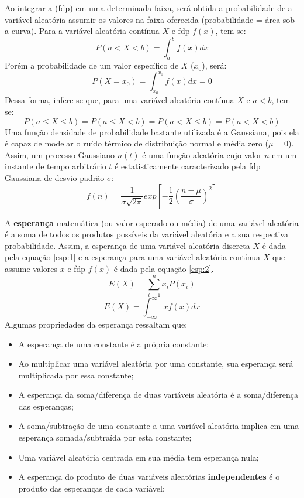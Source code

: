 Ao integrar a (fdp) em uma determinada faixa, será obtida a probabilidade de a variável aleatória assumir os valores na faixa oferecida (probabilidade = área sob a curva). Para a variável aleatória contínua $X$ e fdp $f(x)$, tem-se:
\begin{equation} \label{fdp:1}
    P(a<X<b) = \int_{a}^{b} f(x) dx
\end{equation}
Porém a probabilidade de um valor específico de $X$ ($x_0$), será:
\begin{equation} \label{fdp:2}
    P(X=x_0) = \int_{x_0}^{x_0} f(x) dx = 0
\end{equation}
Dessa forma, infere-se que, para uma variável aleatória contínua $X$ e $a<b$, tem-se:
\begin{equation} \label{fdp:2}
    P(a \leq X \leq b) = P(a \leq X < b) = P(a < X \leq b) = P(a < X < b)
\end{equation}
Uma função densidade de probabilidade bastante utilizada é a Gaussiana, pois ela é capaz de modelar o ruído térmico de distribuição normal e média zero ($\mu = 0$). Assim, um processo Gaussiano $n(t)$ é uma função aleatória cujo valor $n$ em um instante de tempo arbitrário $t$ é estatisticamente caracterizado pela fdp Gaussiana de desvio padrão $\sigma$: \cite{ref8}
\begin{equation} \label{fdp:2}
    f(n) = \frac{1}{\sigma\sqrt{2\pi}}exp\left[-\frac{1}{2}\left(\frac{n-\mu}{\sigma}\right)^2\right]
\end{equation}

A \textbf{esperança} matemática (ou valor esperado ou média) de uma variável aleatória é a soma de todos os produtos possíveis da variável aleatória e a sua respectiva probabilidade. Assim, a esperança de uma variável aleatória discreta $X$ é dada pela equação \ref{esp:1} e a esperança para uma variável aleatória contínua $X$ que assume valores $x$ e fdp $f(x)$ é dada pela equação \ref{esp:2}.
\begin{equation} \label{esp:1}
    E(X) = \sum_{i=1}^{n} x_iP(x_i)
\end{equation}
\begin{equation} \label{esp:2}
    E(X) = \int_{-\infty}^{\infty} x f(x) dx
\end{equation}
Algumas propriedades da esperança ressaltam que:
\begin{itemize}
    \item A esperança de uma constante é a própria constante;
    \item Ao multiplicar uma variável aleatória por uma constante, sua esperança será multiplicada por essa constante;
    \item A esperança da soma/diferença de duas variáveis aleatória é a soma/diferença das esperanças;
    \item A soma/subtração de uma constante a uma variável aleatória implica em uma esperança somada/subtraída por esta constante;
    \item Uma variável aleatória centrada em sua média tem esperança nula;
    \item A esperança do produto de duas variáveis aleatórias \textbf{independentes} é o produto das esperanças de cada variável;
\end{itemize}

